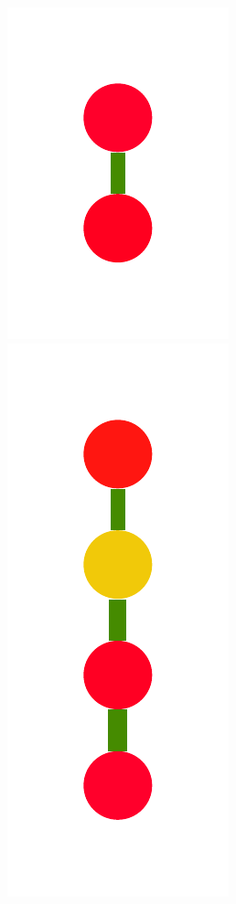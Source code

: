 \documentclass[a4paper,10pt]{article}
\begin{document}
\begin{figure}
{    \includegraphics[scale=.14]{../figures/vector/6-3-recursion-induced-5.pdf}
    \includegraphics[scale=.14]{../figures/vector/6-3-recursion-induced-6.pdf}
}
\end{figure}
\end{document}
